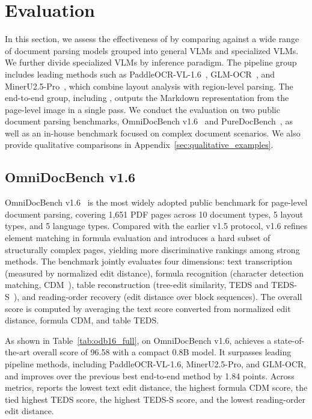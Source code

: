 \section{Evaluation}

In this section, we assess the effectiveness of \ours{} by comparing against a wide range of document parsing models grouped into general VLMs and specialized VLMs. We further divide specialized VLMs by inference paradigm. The pipeline group includes leading methods such as PaddleOCR-VL-1.6~\cite{paddleocrvl16}, GLM-OCR~\cite{glmocr}, and MinerU2.5-Pro~\cite{mineru25pro}, which combine layout analysis with region-level parsing. The end-to-end group, including \ours{}, outputs the Markdown representation from the page-level image in a single pass. We conduct the evaluation on two public document parsing benchmarks, OmniDocBench v1.6~\cite{omnidocbench} and PureDocBench~\cite{puredocbench}, as well as an in-house benchmark focused on complex document scenarios. We also provide qualitative comparisons in Appendix~\ref{sec:qualitative_examples}.

\subsection{OmniDocBench v1.6}

OmniDocBench v1.6~\cite{omnidocbench} is the most widely adopted public benchmark for page-level document parsing, covering 1,651 PDF pages across 10 document types, 5 layout types, and 5 language types. Compared with the earlier v1.5 protocol, v1.6 refines element matching in formula evaluation and introduces a hard subset of structurally complex pages, yielding more discriminative rankings among strong methods. The benchmark jointly evaluates four dimensions: text transcription (measured by normalized edit distance), formula recognition (character detection matching, CDM~\cite{cdm}), table reconstruction (tree-edit similarity, TEDS and TEDS-S~\cite{pubtabnet}), and reading-order recovery (edit distance over block sequences). The overall score is computed by averaging the text score converted from normalized edit distance, formula CDM, and table TEDS.

As shown in Table~\ref{tab:odb16_full}, on OmniDocBench v1.6, \ours{} achieves a state-of-the-art overall score of 96.58 with a compact 0.8B model. It surpasses leading pipeline methods, including PaddleOCR-VL-1.6, MinerU2.5-Pro, and GLM-OCR, and improves over the previous best end-to-end method by 1.84 points. Across metrics, \ours{} reports the lowest text edit distance, the highest formula CDM score, the tied highest TEDS score, the highest TEDS-S score, and the lowest reading-order edit distance.

